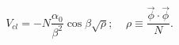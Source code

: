 \begin{equation}
V_{cl} = -N \frac {\alpha_0} {\beta^2} \cos \beta \sqrt{\rho};  ~~~~~\rho
\equiv \frac{\vec \phi \cdot \vec \phi} {N}.
\end{equation}

